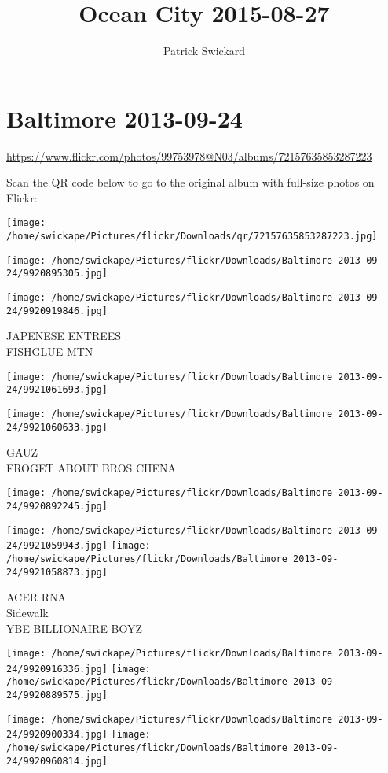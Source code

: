 \documentclass[10pt,letterpaper]{article}
\title{Ocean City 2015-08-27}
\author{Patrick Swickard}
\date{}
\begin{document}
\section*{Baltimore 2013-09-24}

\url{https://www.flickr.com/photos/99753978@N03/albums/72157635853287223}

Scan the QR code below to go to the original album with full-size photos on Flickr:

\texttt{[image: /home/swickape/Pictures/flickr/Downloads/qr/72157635853287223.jpg]}
\pagebreak

\texttt{[image: /home/swickape/Pictures/flickr/Downloads/Baltimore 2013-09-24/9920895305.jpg]}

\vspace{0.25in}
\texttt{[image: /home/swickape/Pictures/flickr/Downloads/Baltimore 2013-09-24/9920919846.jpg]}

JAPENESE ENTREES\\
FISHGLUE MTN
\pagebreak

\texttt{[image: /home/swickape/Pictures/flickr/Downloads/Baltimore 2013-09-24/9921061693.jpg]}

\vspace{0.25in}
\texttt{[image: /home/swickape/Pictures/flickr/Downloads/Baltimore 2013-09-24/9921060633.jpg]}

GAUZ\\
FROGET ABOUT BROS CHENA
\pagebreak

\texttt{[image: /home/swickape/Pictures/flickr/Downloads/Baltimore 2013-09-24/9920892245.jpg]}

\vspace{0.25in}
\texttt{[image: /home/swickape/Pictures/flickr/Downloads/Baltimore 2013-09-24/9921059943.jpg]}
\texttt{[image: /home/swickape/Pictures/flickr/Downloads/Baltimore 2013-09-24/9921058873.jpg]}

ACER RNA\\
Sidewalk\\
YBE BILLIONAIRE BOYZ
\pagebreak

\texttt{[image: /home/swickape/Pictures/flickr/Downloads/Baltimore 2013-09-24/9920916336.jpg]}
\texttt{[image: /home/swickape/Pictures/flickr/Downloads/Baltimore 2013-09-24/9920889575.jpg]}

\texttt{[image: /home/swickape/Pictures/flickr/Downloads/Baltimore 2013-09-24/9920900334.jpg]}
\texttt{[image: /home/swickape/Pictures/flickr/Downloads/Baltimore 2013-09-24/9920960814.jpg]}
\end{document}
